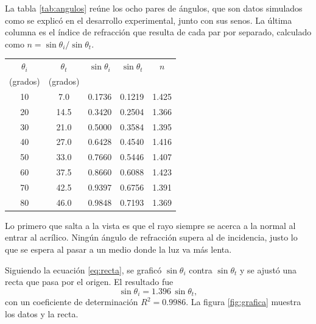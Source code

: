 La tabla \ref{tab:angulos} reúne los ocho pares de ángulos, que son datos simulados como se explicó en el desarrollo experimental, junto con sus senos. La última columna es el índice de refracción que resulta de cada par por separado, calculado como $n = \sin\theta_i / \sin\theta_t$.

\begin{center}
\begin{tabular}{ccccc}
\hline
$\theta_i$ & $\theta_t$ & $\sin\theta_i$ & $\sin\theta_t$ & $n$ \\
(grados) & (grados) & & & \\
\hline
10 & 7.0  & 0.1736 & 0.1219 & 1.425 \\
20 & 14.5 & 0.3420 & 0.2504 & 1.366 \\
30 & 21.0 & 0.5000 & 0.3584 & 1.395 \\
40 & 27.0 & 0.6428 & 0.4540 & 1.416 \\
50 & 33.0 & 0.7660 & 0.5446 & 1.407 \\
60 & 37.5 & 0.8660 & 0.6088 & 1.423 \\
70 & 42.5 & 0.9397 & 0.6756 & 1.391 \\
80 & 46.0 & 0.9848 & 0.7193 & 1.369 \\
\hline
\end{tabular}
\label{tab:angulos}
\end{center}

Lo primero que salta a la vista es que el rayo siempre se acerca a la normal al entrar al acrílico. Ningún ángulo de refracción supera al de incidencia, justo lo que se espera al pasar a un medio donde la luz va más lenta.

Siguiendo la ecuación \eqref{eq:recta}, se graficó $\sin\theta_i$ contra $\sin\theta_t$ y se ajustó una recta que pasa por el origen. El resultado fue
\begin{equation}
\sin\theta_i = 1.396 \, \sin\theta_t ,
\label{eq:ajuste}
\end{equation}
con un coeficiente de determinación $R^2 = 0.9986$. La figura \ref{fig:grafica} muestra los datos y la recta.

